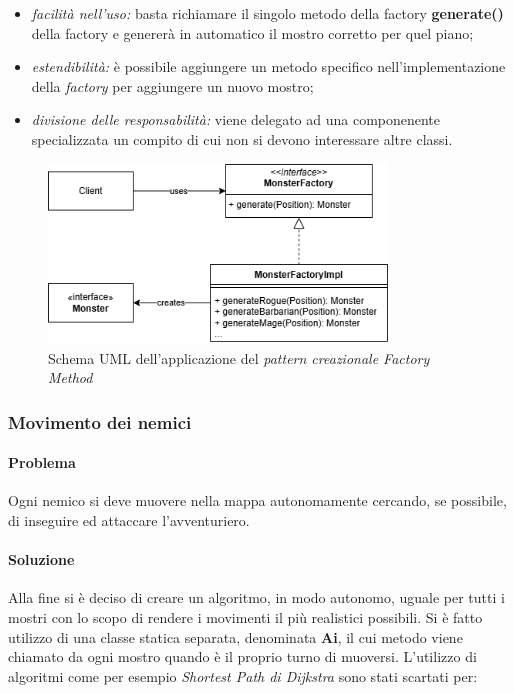 \documentclass{report}
\begin{document}
\begin{itemize}
    \item \textit{facilità nell'uso:} basta richiamare il singolo metodo della factory \textbf{generate()} della factory e genererà in automatico il mostro corretto per quel piano;
    \item \textit{estendibilità:} è possibile aggiungere un metodo specifico nell'implementazione della \textit{factory} per aggiungere un nuovo mostro;
    \item \textit{divisione delle responsabilità:} viene delegato ad una componenente specializzata un compito di cui non si devono interessare altre classi.
\end{itemize}

\begin{figure}[H]
    \centering
    \includegraphics[width=9cm]{FactoryMethod.png}
    \caption{Schema UML dell'applicazione del \textit{pattern creazionale Factory Method}}
\end{figure}

\clearpage
\subsubsection{Movimento dei nemici}

\paragraph{Problema} Ogni nemico si deve muovere nella mappa autonomamente cercando, se possibile, di inseguire ed attaccare l'avventuriero.

\paragraph{Soluzione} Alla fine si è deciso di creare un algoritmo, in modo autonomo, uguale per tutti i mostri con lo scopo di rendere i movimenti il più realistici possibili. Si è fatto 
%
utilizzo di una classe statica separata, denominata \textbf{Ai}, il cui metodo viene chiamato da ogni mostro quando è il proprio turno di muoversi. L'utilizzo di algoritmi come per esempio
%
\textit{Shortest Path di Dijkstra} sono stati scartati per:
\end{document}
